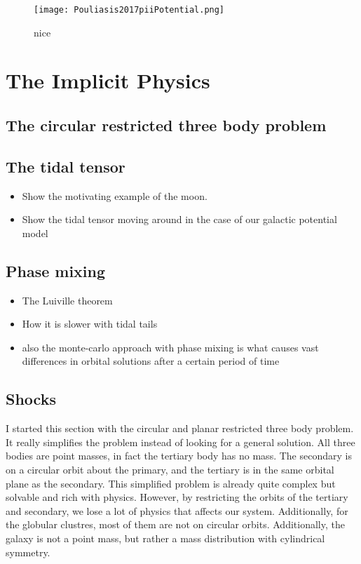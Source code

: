         \begin{figure}
            \centering
            \texttt{[image: Pouliasis2017piiPotential.png]}
            \caption{nice}
        \end{figure}        
    

\section{The Implicit Physics}

    \subsection{The circular restricted three body problem}

    \subsection{The tidal tensor}
        \begin{itemize}
            \item Show the motivating example of the moon. 
            \item Show the tidal tensor moving around in the case of our galactic potential model 
        \end{itemize}


    \subsection{Phase mixing}
        \begin{itemize}
            \item The Luiville theorem
            \item How it is slower with tidal tails 
            \item also the monte-carlo approach with phase mixing is what causes vast differences in orbital solutions after a certain period of time 
        \end{itemize}
    
    \subsection{Shocks}
        I started this section with the circular and planar restricted three body problem. It really simplifies the problem instead of looking for a general solution. All three bodies are point masses, in fact the tertiary body has no mass. The secondary is on a circular orbit about the primary, and the tertiary is in the same orbital plane as the secondary. This simplified problem is already quite complex but solvable and rich with physics. However, by restricting the orbits of the tertiary and secondary, we lose a lot of physics that affects our system. Additionally, for the globular clustres, most of them are not on circular orbits. Additionally, the galaxy is not a point mass, but rather a mass distribution with cylindrical symmetry.        



